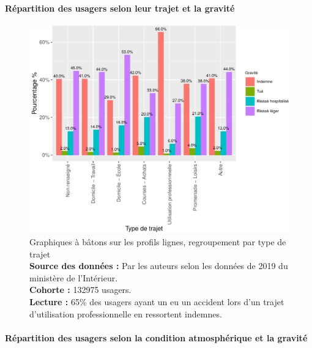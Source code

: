\documentclass[french,]{tp}
\let\oldparagraph\paragraph
\renewcommand{\paragraph}[1]{\oldparagraph{#1}\mbox{}}
\begin{document}
\newpage

\hypertarget{ruxe9partition-des-usagers-selon-leur-trajet-et-la-gravituxe9}{%
\paragraph{Répartition des usagers selon leur trajet et la gravité}\label{ruxe9partition-des-usagers-selon-leur-trajet-et-la-gravituxe9}}






\begin{figure}[ht!]

{\centering \includegraphics{Prediction_Gravite_files/figure-latex/barplottrajet-1} 

}

\caption{Graphiques à bâtons sur les profils lignes, regroupement par type de trajet\\
\textbf{Source des données :} Par les auteurs selon les données de 2019 du ministère de l'Intérieur.\\
\textbf{Cohorte :} 132975 usagers.\\
\textbf{Lecture :} 65\% des usagers ayant un eu un accident lors d'un trajet d'utilisation professionnelle en ressortent indemnes.}\label{fig:barplottrajet}
\end{figure}
\newpage

\hypertarget{ruxe9partition-des-usagers-selon-la-condition-atmosphuxe9rique-et-la-gravituxe9}{%
\paragraph{Répartition des usagers selon la condition atmosphérique et la gravité}\label{ruxe9partition-des-usagers-selon-la-condition-atmosphuxe9rique-et-la-gravituxe9}}
\end{document}
